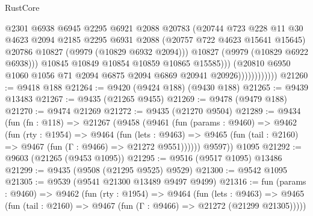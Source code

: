 \begin{lexlean}{RustCore}
\begin{coremodule}
                                  @2301
                                  @6938
                                  @6945
                                  @2295
                                  @6921
                                  @2088
                                  @20783
                                  (@20744
                                    @723
                                    @228
                                    @11
                                    @30
                                    @4623
                                    @2094
                                    @2185
                                    @2295
                                    @6931
                                    @2088
                                    (@20757 @722 @4623 @15641 @15645)
                                    @20786
                                    @10827
                                    (@9979 (@10829 @6932 @2094)))
                                  @10827
                                  (@9979 (@10829 @6922 @6938)))
                                @10845
                                @10849
                                @10854
                                @10859
                                @10865
                                @15585)))
                          (@20810
                            @6950
                            @1060
                            @1056
                            @71
                            @2094
                            @6875
                            @2094
                            @6869
                            @20941
                            @20926))))))))))))
@21260 := @9418 @188
@21264 := @9420 (@9424 @188) (@9430 @188)
@21265 := @9439 @13483
@21267 := @9435 (@21265 @9455)
@21269 := @9478 (@9479 @188)
@21270 := @9474 @21269
@21272 := @9435 (@21270 @9504)
@21289 := @9434
    (fun (fn : @118) =>
    @21267
      (@9458
        (@9461
          (fun (params : @9460) =>
          @9462
            (fun (rty : @1954) =>
            @9464
              (fun (lets : @9463) =>
              @9465 (fun (tail : @2160) => @9467 (fun (Γ : @9466) => @21272 @9551))))))
        @9597))
    @1095
@21292 := @9603 (@21265 (@9453 @1095))
@21295 := @9516 (@9517 @1095) @13486
@21299 := @9435 (@9508 (@21295 @9525) @9529)
@21300 := @9542 @1095
@21305 := @9539 (@9541 @21300 @13489 @9497 @9499)
@21316 := fun (params : @9460) =>
  @9462
    (fun (rty : @1954) =>
    @9464
      (fun (lets : @9463) =>
      @9465 (fun (tail : @2160) => @9467 (fun (Γ : @9466) => @21272 (@21299 @21305)))))

\end{coremodule}
\end{lexlean}

